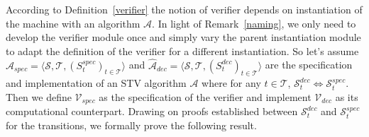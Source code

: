 \documentclass[10pt,conference]{IEEEtran}
\begin{document}
According to Definition~\ref{verifier} the notion of verifier depends on instantiation of the machine with an algorithm $\mathcal{A}$. In light of Remark~\ref{naming}, we only need to develop the verifier module once and simply vary the parent instantiation module to adapt the definition of the verifier for a different instantiation. So let's assume $\hat{\mathcal{A}}_{spec}= \langle \mathcal{S}, \mathcal{T}, (S_{t}^{spec})_{t \in \mathcal{T}} \rangle$ and $\hat{\mathcal{A}}_{dec}= \langle \mathcal{S}, \mathcal{T}, (S_{t}^{dec})_{t \in \mathcal{T}} \rangle$ are the specification and implementation of an STV algorithm $\mathcal{A}$ where for any $t\in\mathcal{T}$, $\mathcal{S}_{t}^{dec}\Leftrightarrow\mathcal{S}_{t}^{spec}$. 
 Then we define $\mathcal{V}_{spec}$ as the specification of the verifier  and implement $\mathcal{V}_{dec}$ as its  computational counterpart. Drawing on proofs established between $\mathcal{S}_{t}^{dec}$ and $\mathcal{S}_{t}^{spec}$ for the transitions, we formally prove the following result.
\end{document}
